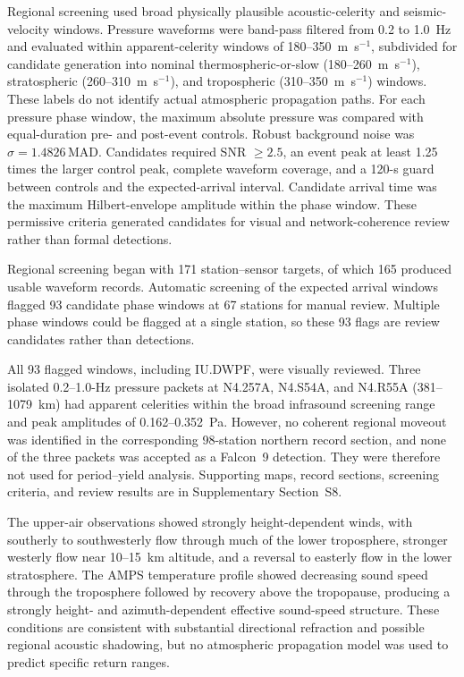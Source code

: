\documentclass[]{seismica}
\begin{document}
Regional screening used broad physically plausible acoustic-celerity and
seismic-velocity windows. Pressure waveforms were band-pass filtered from 0.2
to 1.0~Hz and evaluated within apparent-celerity windows of
180--350~m~s$^{-1}$, subdivided for candidate generation into nominal
thermospheric-or-slow (180--260~m~s$^{-1}$), stratospheric
(260--310~m~s$^{-1}$), and tropospheric (310--350~m~s$^{-1}$) windows. These
labels do not identify actual atmospheric propagation paths. For each pressure
phase window, the maximum absolute pressure was compared with equal-duration
pre- and post-event controls. Robust background noise was
$\sigma=1.4826\,\mathrm{MAD}$. Candidates required SNR $\geq2.5$, an event
peak at least 1.25 times the larger control peak, complete waveform coverage,
and a 120-s guard between controls and the expected-arrival interval. Candidate
arrival time was the maximum Hilbert-envelope amplitude within the phase
window. These permissive criteria generated candidates for visual and
network-coherence review rather than formal detections.

Regional screening began with 171 station--sensor targets, of which 165
produced usable waveform records. Automatic screening of the expected arrival
windows flagged 93 candidate phase windows at 67 stations for manual review.
Multiple phase windows could be flagged at a single station, so these 93 flags
are review candidates rather than detections.

All 93 flagged windows, including IU.DWPF, were visually reviewed. Three
isolated 0.2--1.0-Hz pressure packets at N4.257A, N4.S54A, and N4.R55A
(381--1079~km) had apparent celerities within the broad infrasound screening
range and peak amplitudes of 0.162--0.352~Pa. However, no coherent regional
moveout was identified in the corresponding 98-station northern record
section, and none of the three packets was accepted as a Falcon~9 detection.
They were therefore not used for period--yield analysis. Supporting maps,
record sections, screening criteria, and review results are in Supplementary
Section~S8.

The upper-air observations showed strongly height-dependent winds, with
southerly to southwesterly flow through much of the lower troposphere, stronger
westerly flow near 10--15~km altitude, and a reversal to easterly flow in the
lower stratosphere. The AMPS temperature profile showed decreasing sound speed
through the troposphere followed by recovery above the tropopause, producing a
strongly height- and azimuth-dependent effective sound-speed structure. These
conditions are consistent with substantial directional refraction and possible
regional acoustic shadowing, but no atmospheric propagation model was used to
predict specific return ranges.
\end{document}
